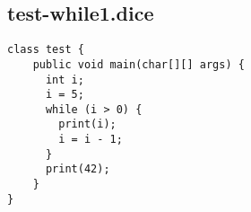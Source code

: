 \subsection{test-while1.dice}
\begin{verbatim}
class test {
	public void main(char[][] args) {
	  int i;
	  i = 5;
	  while (i > 0) {
	    print(i);
	    i = i - 1;
	  }
	  print(42);
	}
}
\end{verbatim}